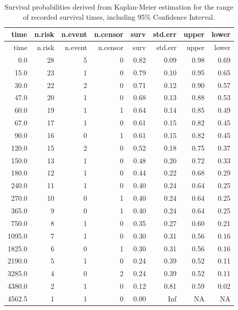 \documentclass[
  authoryear,
  preprint,
  3p]{elsarticle}
\begin{document}
\begin{longtable}[]{@{}rrrrrrrr@{}}
\caption{Survival probabilities derived from Kaplan-Meier estimation for
the range of recorded survival times, including 95\% Confidence
Interval.}\tabularnewline
\toprule()
time & n.risk & n.event & n.censor & surv & std.err & upper & lower \\
\midrule()
\endfirsthead
\toprule()
time & n.risk & n.event & n.censor & surv & std.err & upper & lower \\
\midrule()
\endhead
0.0 & 28 & 5 & 0 & 0.82 & 0.09 & 0.98 & 0.69 \\
15.0 & 23 & 1 & 0 & 0.79 & 0.10 & 0.95 & 0.65 \\
30.0 & 22 & 2 & 0 & 0.71 & 0.12 & 0.90 & 0.57 \\
47.0 & 20 & 1 & 0 & 0.68 & 0.13 & 0.88 & 0.53 \\
60.0 & 19 & 1 & 1 & 0.64 & 0.14 & 0.85 & 0.49 \\
67.0 & 17 & 1 & 0 & 0.61 & 0.15 & 0.82 & 0.45 \\
90.0 & 16 & 0 & 1 & 0.61 & 0.15 & 0.82 & 0.45 \\
120.0 & 15 & 2 & 0 & 0.52 & 0.18 & 0.75 & 0.37 \\
150.0 & 13 & 1 & 0 & 0.48 & 0.20 & 0.72 & 0.33 \\
180.0 & 12 & 1 & 0 & 0.44 & 0.22 & 0.68 & 0.29 \\
240.0 & 11 & 1 & 0 & 0.40 & 0.24 & 0.64 & 0.25 \\
270.0 & 10 & 0 & 1 & 0.40 & 0.24 & 0.64 & 0.25 \\
365.0 & 9 & 0 & 1 & 0.40 & 0.24 & 0.64 & 0.25 \\
750.0 & 8 & 1 & 0 & 0.35 & 0.27 & 0.60 & 0.21 \\
1095.0 & 7 & 1 & 0 & 0.30 & 0.31 & 0.56 & 0.16 \\
1825.0 & 6 & 0 & 1 & 0.30 & 0.31 & 0.56 & 0.16 \\
2190.0 & 5 & 1 & 0 & 0.24 & 0.39 & 0.52 & 0.11 \\
3285.0 & 4 & 0 & 2 & 0.24 & 0.39 & 0.52 & 0.11 \\
4380.0 & 2 & 1 & 0 & 0.12 & 0.81 & 0.59 & 0.02 \\
4562.5 & 1 & 1 & 0 & 0.00 & Inf & NA & NA \\
\bottomrule()
\end{longtable}
\end{document}
